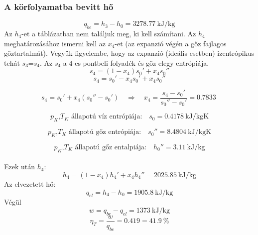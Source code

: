 \subsubsection{A körfolyamatba bevitt hő}
\begin{equation*}
      q_{be} = {h_3}-{h_0} = \SI{3278.77}{\kilo\joule\per\kilogram}
\end{equation*}
Az $h_4$-et a táblázatban nem találjuk meg, ki kell számítani.
Az $h_4$ meghatározásához ismerni kell az $x_4$-et (az expanzió végén a gőz fajlagos gőztartalmát).
Vegyük figyelembe, hogy az expanzió (ideális esetben) izentrópikus tehát $s_3$=$s_4$. Az $s_4$ a 4-es pontbeli folyadék és gőz elegy entrópiája.
\begin{equation*}
s_4 = \left (1 - x_4 \right)s_0'+x_4 s_0'' 
\end{equation*}
\begin{equation*}
s_4 = s_0'-x_4 s_0'+x_4 s_0'' 
\end{equation*}

\begin{equation*}
 s_4 =  s_0'+ x_4 \left(s_0'' - s_0' \right)
\quad 
\Rightarrow
\quad 
x_4
= 
\dfrac{s_4 - s_0'}{s_0'' - s_0'} = \SI{0.7833}{}
\end{equation*}

\begin{equation*}
	 \textrm{$p_K$,$T_K$ állapotú víz entrópiája:} 
	 \quad 
	 s_0=\SI{0.4178}{\kilo\joule\per\kilogram\kelvin}
\end{equation*}


\begin{equation*}
	\textrm{$p_K$,$T_K$ állapotú gőz entrópiája:}
	\quad
s_0'' = \SI{8.4804}{\kilo\joule\per\kilogram\kelvin}
\end{equation*}

\begin{equation*}
\textrm{$p_K$,$T_K$ állapotú gőz entalpiája:}
\quad
h_0'' = \SI{3.11}{\kilo\joule\per\kilogram}
\end{equation*}
\\Ezek után $h_4$:
\begin{equation*}
	h_4 =  \left (1 - x_4 \right)h_4'+x_4 h_4''=\SI{2025.85}{\kilo\joule\per\kilogram}
\end{equation*}
Az elvezetett hő:
\begin{equation*}
	q_{el} =h_4 - h_0 =
	\SI{1905.8}{\kilo\joule\per\kilogram} 
\end{equation*}
Végül
\begin{equation*}
	w={q_{be}} - {q_{el}} =
	\SI{1373}{\kilo\joule\per\kilogram} 
\end{equation*}
\begin{equation*}
	\eta_T=\dfrac{w} {q_{be}}=
	\SI{0.419}
	=
	\SI{41.9}{\%}
\end{equation*}
